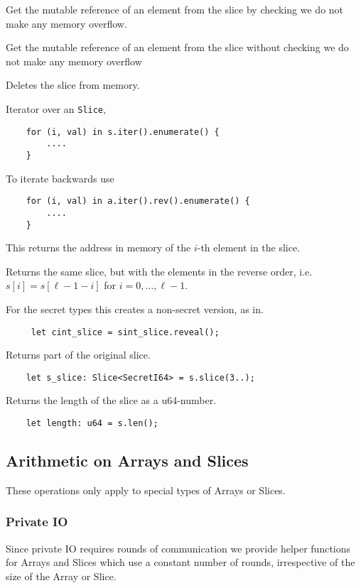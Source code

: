 Get the mutable reference of an element from the slice by checking we do not make any memory overflow.

Get the mutable reference of an element from the slice without checking we do not make any memory overflow

Deletes the slice from memory.


Iterator over an \verb|Slice|,
\begin{lstlisting}
    for (i, val) in s.iter().enumerate() {
        ....
    }
\end{lstlisting}
To iterate backwards use
\begin{lstlisting}
    for (i, val) in a.iter().rev().enumerate() {
        ....
    }
\end{lstlisting}

This returns the address in memory of the $i$-th element in the slice.

Returns the same slice, but with the elements in the reverse order, i.e.
$s[i] = s[\ell-1-i]$ for $i=0,\ldots,\ell-1$.

For the secret types this creates a non-secret version, as in.
\begin{lstlisting}
     let cint_slice = sint_slice.reveal();
\end{lstlisting}

Returns part of the original slice.
\begin{lstlisting}
    let s_slice: Slice<SecretI64> = s.slice(3..);
\end{lstlisting}

Returns the length of the slice as a u64-number.
\begin{lstlisting}
    let length: u64 = s.len();
\end{lstlisting}

\subsection{Arithmetic on Arrays and Slices}
These operations only apply to special types of Arrays or Slices.

\subsubsection{Private IO}
Since private IO requires rounds of communication we provide helper functions
for Arrays and Slices which use a constant number of rounds, irrespective of the
size of the Array or Slice.


